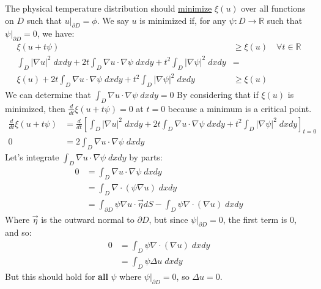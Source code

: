 \begin{proposition}
    The physical temperature distribution should \underline{minimize} $\xi(u)$ over all functions on $D$ such that $u|_{\partial D} = \phi$. We say $u$ is minimized if, for any $\psi : D \rightarrow \mathbb{R}$ such that $\psi|_{\partial D} = 0$, we have:
    \begin{align*}
        \xi(u + t\psi)                                                                                                  & \geq \xi(u) \quad \forall t \in \mathbb{R} \\
        \int_D |\nabla u|^2 \; dxdy + 2t \int_D \nabla u \cdot \nabla \psi \; dxdy + t^2 \int_D |\nabla \psi|^2 \; dxdy & =                                          \\
        \xi (u) + 2t\int_D \nabla u \cdot \nabla \psi \; dxdy + t^2 \int_D |\nabla \psi|^2 \; dxdy                      & \geq \xi(u)
    \end{align*}
    We can determine that $\int_D \nabla u \cdot \nabla \psi \; dxdy = 0$ By considering that if $\xi(u)$ is minimized, then $\frac{d}{dt} \xi(u + t\psi) = 0$ at $t = 0$ because a minimum is a critical point.
    \begin{align}
        \frac{d}{dt} \xi(u + t\psi) & = \frac{d}{dt}\left[ \int_D |\nabla u|^2 \; dxdy + 2t \int_D \nabla u \cdot \nabla \psi \; dxdy + t^2 \int_D |\nabla \psi|^2 \; dxdy \right]_{t = 0} \\
        0                           & = 2\int_D \nabla u \cdot \nabla \psi \; dxdy
    \end{align}
    Let's integrate $\int_D \nabla u \cdot \nabla \psi \; dxdy$ by parts:
    \begin{align*}
        0 & = \int_D \nabla u \cdot \nabla \psi \;dxdy                                                          \\
          & = \int_D\nabla \cdot (\psi \nabla u)   \; dxdy                                                      \\
          & = \int_{\partial D} \psi \nabla u \cdot \vec{\eta} dS - \int_D \psi \nabla \cdot (\nabla u) \; dxdy
    \end{align*}
    Where $\vec{\eta}$ is the outward normal to $\partial D$, but since $\psi|_{\partial D} = 0$, the first term is 0, and so:
    \begin{align*}
        0 & = \int_D \psi \nabla \cdot (\nabla u) \; dxdy \\
          & = \int_D \psi \Delta u \; dxdy
    \end{align*}
    But this should hold for \textbf{all} $\psi$ where $\psi|_{\partial D} = 0$, so $\Delta u = 0$.

\end{proposition}
